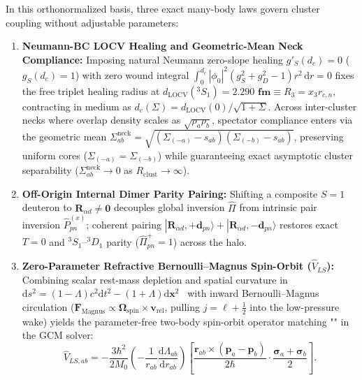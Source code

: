\documentclass[11pt, a4paper]{article}
\DeclareRobustCommand{\dd}{\mathrm{d}}
\begin{document}
In this orthonormalized basis, three exact many-body laws govern cluster coupling without adjustable parameters:
\begin{enumerate}[leftmargin=1.8em, itemsep=2pt]
    \item \textbf{Neumann-BC LOCV Healing and Geometric-Mean Neck Compliance:} Imposing natural Neumann zero-slope healing $g'_S(d_c) = 0$ ($g_S(d_c) = 1$) with zero wound integral $\int_0^{d_c} |\phi_0|^2(g_S^2 + g_D^2 - 1)r^2\,\dd r = 0$ fixes the free triplet healing radius at $d_{\mathrm{LOCV}}(^3S_1) = \mathbf{2.290\text{ fm}} \equiv R_3 = x_3 r_{c,n}$, contracting in medium as $d_c(\Sigma) = d_{\mathrm{LOCV}}(0)/\sqrt{1 + \Sigma}$. Across inter-cluster necks where overlap density scales as $\sqrt{\rho_a\rho_b}$, spectator compliance enters via the geometric mean $\Sigma_{ab}^{\mathrm{neck}} = \sqrt{(\Sigma_{(-a)} - s_{ab})(\Sigma_{(-b)} - s_{ab})}$, preserving uniform cores ($\Sigma_{(-a)} = \Sigma_{(-b)}$) while guaranteeing exact asymptotic cluster separability ($\Sigma_{ab}^{\mathrm{neck}} \to 0$ as $R_{\mathrm{clust}} \to \infty$).
    \item \textbf{Off-Origin Internal Dimer Parity Pairing:} Shifting a composite $S = 1$ deuteron to $\mathbf{R}_{\alpha d} \neq \mathbf{0}$ decouples global inversion $\hat{\Pi}$ from intrinsic pair inversion $\hat{P}_{pn}^{(x)}$; coherent pairing $|\mathbf{R}_{\alpha d}, +\mathbf{d}_{pn}\rangle + |\mathbf{R}_{\alpha d}, -\mathbf{d}_{pn}\rangle$ restores exact $T = 0$ and $^3S_1\text{--}{}^3D_1$ parity ($\hat{\Pi}_{pn}^+ = 1$) across the halo.
    \item \textbf{Zero-Parameter Refractive Bernoulli--Magnus Spin-Orbit ($\hat{V}_{LS}$):} Combining scalar rest-mass depletion and spatial curvature in $\dd s^2 = (1 - \Lambda)c^2\dd t^2 - (1 + \Lambda)\dd\mathbf{x}^2$~\cite{bairmosheh2026,bairmosheh2026b} with inward Bernoulli--Magnus circulation ($\mathbf{F}_{\mathrm{Magnus}} \propto \boldsymbol{\Omega}_{\mathrm{spin}}\times\mathbf{v}_{\mathrm{rel}}$, pulling $j = \ell + \frac{1}{2}$ into the low-pressure wake) yields the parameter-free two-body spin-orbit operator matching "" in the GCM solver:
    \begin{equation}
        \hat{V}_{LS,ab} = -\frac{3\hbar^2}{2 M_0}\left(-\frac{1}{r_{ab}}\frac{\dd\Lambda_{ab}}{\dd r_{ab}}\right)\left[\frac{\mathbf{r}_{ab}\times(\mathbf{p}_a - \mathbf{p}_b)}{2\hbar}\cdot\frac{\boldsymbol{\sigma}_a + \boldsymbol{\sigma}_b}{2}\right].
        \label{eq:refractive_vls}
    \end{equation}
\end{enumerate}
\end{document}
